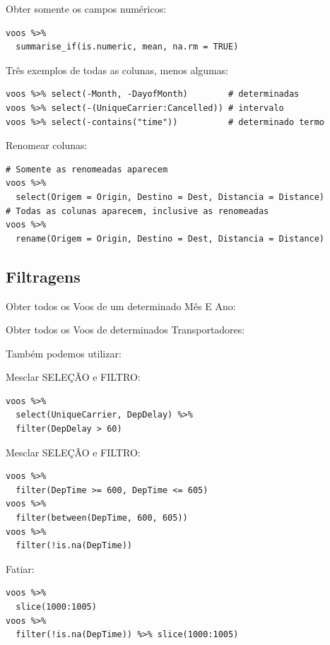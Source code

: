 \documentclass[a4paper,11pt]{article}
\begin{document}
Obter somente os campos numéricos:
\begin{lstlisting}
voos %>% 
  summarise_if(is.numeric, mean, na.rm = TRUE)
\end{lstlisting}

Três exemplos de todas as colunas, menos algumas:
\begin{lstlisting}
voos %>% select(-Month, -DayofMonth)        # determinadas
voos %>% select(-(UniqueCarrier:Cancelled)) # intervalo
voos %>% select(-contains("time"))          # determinado termo 
\end{lstlisting}

Renomear colunas:
\begin{lstlisting}
# Somente as renomeadas aparecem
voos %>% 
  select(Origem = Origin, Destino = Dest, Distancia = Distance)
# Todas as colunas aparecem, inclusive as renomeadas
voos %>% 
  rename(Origem = Origin, Destino = Dest, Distancia = Distance)
\end{lstlisting}

\subsection{Filtragens}
Obter todos os Voos de um determinado Mês E Ano: \\

Obter todos os Voos de determinados Transportadores: \\

Também podemos utilizar: \\

Mesclar SELEÇÃO e FILTRO:
\begin{lstlisting}
voos %>%
  select(UniqueCarrier, DepDelay) %>%
  filter(DepDelay > 60)
\end{lstlisting}

Mesclar SELEÇÃO e FILTRO:
\begin{lstlisting}
voos %>% 
  filter(DepTime >= 600, DepTime <= 605)
voos %>% 
  filter(between(DepTime, 600, 605))
voos %>% 
  filter(!is.na(DepTime))
\end{lstlisting}

Fatiar:
\begin{lstlisting}
voos %>% 
  slice(1000:1005)
voos %>% 
  filter(!is.na(DepTime)) %>% slice(1000:1005)
\end{lstlisting}
\end{document}
